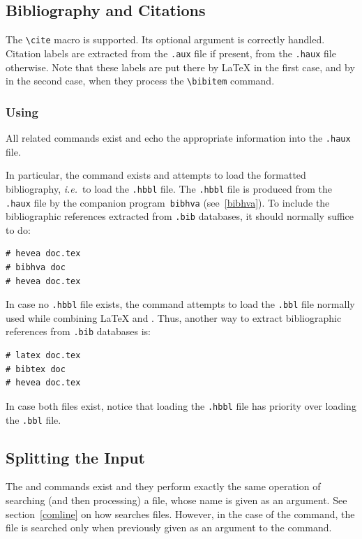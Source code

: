 \subsection{Bibliography and Citations}
The \verb+\cite+ macro is supported. Its optional argument is
correctly handled. Citation labels  are extracted from the
\texttt{.aux} file if present, from the \texttt{.haux} file otherwise.
Note that these labels are put there by \LaTeX{} in the first case,
and by \hevea{} in the second case, when they process the
\verb+\bibitem+ command.

\subsubsection*{Using \BibTeX}
All \BibTeX{} related commands exist and echo the appropriate
information into the \texttt{.haux} file.

In particular, the \verb++ command exists and attempts to load the
formatted bibliography, \emph{i.e.}\ to load the \texttt{.hbbl} file.
The \texttt{.hbbl} file is produced from the \texttt{.haux} file by
the companion program~\texttt{bibhva} (see~\ref{bibhva}).
To include the bibliographic references extracted from \texttt{.bib}
databases, it should normally suffice to do:
\begin{verbatim}
# hevea doc.tex
# bibhva doc
# hevea doc.tex
\end{verbatim}

In case no \texttt{.hbbl} file exists,
the \verb++ command attempts to load
the \texttt{.bbl} file normally used while combining \LaTeX{} and
\BibTeX. Thus, another way to extract bibliographic references from
\texttt{.bib} databases is:
\begin{verbatim}
# latex doc.tex
# bibtex doc
# hevea doc.tex
\end{verbatim}
In case both files exist,
notice that loading the \texttt{.hbbl} file has priority over
loading the \texttt{.bbl} file.


\subsection{Splitting the Input}
The \verb++ and \verb++ commands exist and they perform
exactly the same operation of searching (and then processing) a file,
whose name is given as an argument.
See section~\ref{comline} on how \hevea{} searches files.
However, in the case of the \verb++ command, the file is
searched only when previously given as an argument to
the \verb++ command.

